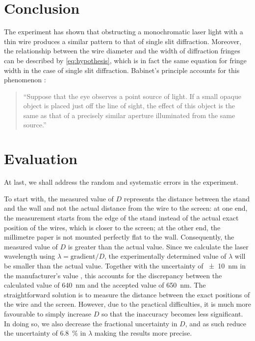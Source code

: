 \documentclass[a4paper, 12pt]{article}
\begin{document}
\section{Conclusion}
The experiment has shown that obstructing a monochromatic laser light with a thin wire produces a similar pattern to that of single slit diffraction. 
Moreover, the relationship between the wire diameter and the width of diffraction fringes can be described by \cref{eq:hypothesis}, which is in fact the same equation for fringe width in the case of single slit diffraction.
Babinet's principle accounts for this phenomenon \autocite{babinet}:
\begin{quote}
    ``Suppose that the eye observes a point source of light.
    If a small opaque object is placed just off the line of sight, the effect of this object is the same as that of a precisely similar aperture illuminated from the same source.''
\end{quote}

\section{Evaluation}
At last, we shall address the random and systematic errors in the experiment.

To start with, the measured value of $D$ represents the distance between the stand and the wall and not the actual distance from the wire to the screen:
at one end, the measurement starts from the edge of the stand instead of the actual exact position of the wires, which is closer to the screen; 
at the other end, the millimetre paper is not mounted perfectly flat to the wall.
Consequently, the measured value of $D$ is greater than the actual value.
Since we calculate the laser wavelength using $\lambda = \text{gradient} / D$, the experimentally determined value of $\lambda$ will be smaller than the actual value. Together with the uncertainty of \SI{+-10}{\nm} in the manufacturer's value \autocite{laser-specs}, this accounts for the discrepancy between the calculated value of \SI{640}{\nm} and the accepted value of \SI{650}{\nm}.
The straightforward solution is to measure the distance between the exact positions of the wire and the screen.
However, due to the practical difficulties, it is much more favourable to simply increase $D$ so that the inaccuracy becomes less significant. 
In doing so, we also decrease the fractional uncertainty in $D$, and as such reduce the uncertainty of \SI{6.8}{\%} in $\lambda$ making the results more precise.
\end{document}

